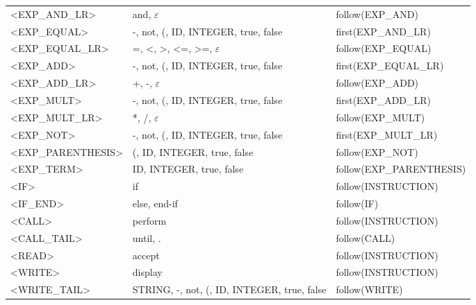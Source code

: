 \documentclass[a4paper,11pt]{article}
\begin{document}
\begin{longtable}{l>{\raggedright}p{6cm}p{6cm}}
	<EXP\_AND\_LR> & and, $\varepsilon$ & follow(EXP\_AND)\\
	<EXP\_EQUAL> & -, not, (, ID, INTEGER, true, false & first(EXP\_AND\_LR)\\
	<EXP\_EQUAL\_LR> & =, <, >, <=, >=, $\varepsilon$ & follow(EXP\_EQUAL)\\
	<EXP\_ADD> & -, not, (, ID, INTEGER, true, false & first(EXP\_EQUAL\_LR)\\
	<EXP\_ADD\_LR> & +, -, $\varepsilon$ & follow(EXP\_ADD)\\
	<EXP\_MULT> & -, not, (, ID, INTEGER, true, false & first(EXP\_ADD\_LR)\\
	<EXP\_MULT\_LR> & *, /, $\varepsilon$ & follow(EXP\_MULT)\\
	<EXP\_NOT> & -, not, (, ID, INTEGER, true, false & first(EXP\_MULT\_LR)\\
	<EXP\_PARENTHESIS> & (, ID, INTEGER, true, false & follow(EXP\_NOT)\\
	<EXP\_TERM> & ID, INTEGER, true, false & follow(EXP\_PARENTHESIS)\\
	<IF> & if & follow(INSTRUCTION)\\
	<IF\_END> & else, end-if & follow(IF)\\
	<CALL> & perform & follow(INSTRUCTION)\\
	<CALL\_TAIL> & until, . & follow(CALL)\\
	<READ> & accept & follow(INSTRUCTION)\\
	<WRITE> & display & follow(INSTRUCTION)\\
	<WRITE\_TAIL> & STRING, -, not, (, ID, INTEGER, true, false & follow(WRITE) \\


\end{longtable}
\end{document}
